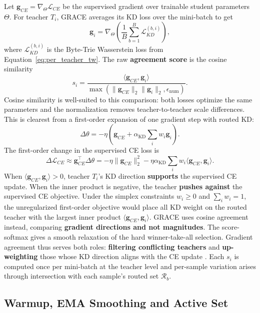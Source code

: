 Let \(\mathbf{g}_{CE}=\nabla_{\Theta}\mathcal{L}_{CE}\) be the supervised
gradient over trainable student parameters \(\Theta\). For teacher \(T_i\),
GRACE averages its KD loss over the mini-batch to get
\[
\mathbf{g}_{i}
=
\nabla_{\Theta}
\left(
\frac{1}{B}\sum_{b=1}^{B}
\mathcal{L}_{KD}^{(b,i)}\right),
\]
where \(\mathcal{L}_{KD}^{(b,i)}\) is the Byte-Trie Wasserstein loss from
Equation~\ref{eq:per_teacher_tw}. The raw \textbf{agreement score} is the cosine
similarity
\begin{equation}
s_i
=
\frac{
\langle \mathbf{g}_{CE},\mathbf{g}_i\rangle
}{
\max\!\left(\|\mathbf{g}_{CE}\|_2\|\mathbf{g}_i\|_2,\epsilon_{\mathrm{num}}\right)
}.
\label{eq:grace-gradient-agreement-score}
\end{equation}
Cosine similarity is well-suited to this comparison: both losses optimize
the same parameters and the normalization removes teacher-to-teacher scale
differences. This is clearest from a first-order expansion of one gradient
step with routed KD:
\[
\Delta\theta
=
-\eta
\left(
\mathbf{g}_{CE}
+
\alpha_{\mathrm{KD}}\sum_i w_i \mathbf{g}_i
\right).
\]
The first-order change in the supervised CE loss is
\[
\Delta\mathcal{L}_{CE}
\approx
\mathbf{g}_{CE}^{\top}\Delta\theta
=
-\eta\|\mathbf{g}_{CE}\|_2^2
-
\eta\alpha_{\mathrm{KD}}\sum_i w_i
\langle \mathbf{g}_{CE},\mathbf{g}_i\rangle .
\]
When \(\langle \mathbf{g}_{CE},\mathbf{g}_i\rangle>0\), teacher \(T_i\)'s KD
direction \textbf{supports} the supervised CE update. When the inner product is
negative, the teacher \textbf{pushes against} the supervised CE objective. Under the
simplex constraints \(w_i\ge 0\) and \(\sum_i w_i=1\), the unregularized
first-order objective would place all KD weight on the routed teacher with the
largest inner product \(\langle \mathbf{g}_{CE},\mathbf{g}_i\rangle\). GRACE uses cosine agreement instead, comparing \textbf{gradient directions and not
magnitudes}. The score-softmax gives a smooth relaxation of the hard
winner-take-all selection. Gradient agreement thus serves both roles:
\textbf{filtering conflicting teachers} and \textbf{up-weighting} those whose KD direction aligns
with the CE update
\cite{yu2020gradient}. Each \(s_i\) is computed once per mini-batch at the teacher level and per-sample
variation arises through intersection with each sample's routed set
\(\mathcal{R}_b\).

\subsection{Warmup, EMA Smoothing and Active Set}
\label{sec:agreement-smoothing-active-set}

